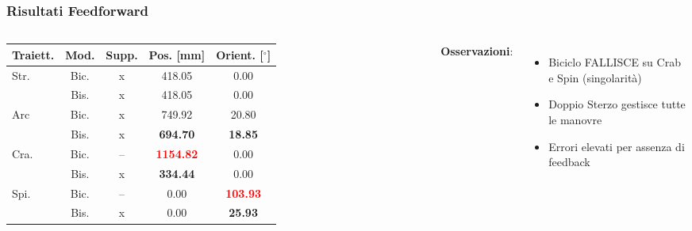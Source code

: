 \begin{frame}
    \frametitle{Risultati Feedforward}
    \begin{columns}
        \begin{table}
            \centering
            \tiny
            \begin{tabular}{@{}lcccc@{}}
                \toprule
                \textbf{Traiett.} & \textbf{Mod.} & \textbf{Supp.} & \textbf{Pos. [mm]}                & \textbf{Orient. [$^\circ$]}      \\
                \midrule
                \multirow{2}{*}{Str.}
                                  & Bic.          & x              & 418.05                            & 0.00                             \\
                                  & Bis.          & x              & 418.05                            & 0.00                             \\
                \midrule
                \multirow{2}{*}{Arc}
                                  & Bic.          & x              & 749.92                            & 20.80                            \\
                                  & Bis.          & x              & \textbf{694.70}                   & \textbf{18.85}                   \\
                \midrule
                \multirow{2}{*}{Cra.}
                                  & Bic.          & --             & \textcolor{red}{\textbf{1154.82}} & 0.00                             \\
                                  & Bis.          & x              & \textbf{334.44}                   & 0.00                             \\
                \midrule
                \multirow{2}{*}{Spi.}
                                  & Bic.          & --             & 0.00                              & \textcolor{red}{\textbf{103.93}} \\
                                  & Bis.          & x              & 0.00                              & \textbf{25.93}                   \\
                \bottomrule
            \end{tabular}
        \end{table}

        \textbf{Osservazioni}:
        \begin{itemize}
            \item Biciclo FALLISCE su Crab e Spin (singolarità)
            \item Doppio Sterzo gestisce tutte le manovre
            \item Errori elevati per assenza di feedback
        \end{itemize}
    \end{columns}
\end{frame}

